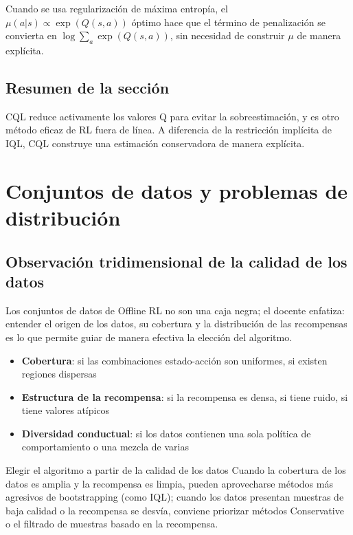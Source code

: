\documentclass[a4paper]{article}
\begin{document}
Cuando se usa regularización de máxima entropía, el $\mu(a|s) \propto \exp(Q(s,a))$ óptimo hace que el término de penalización se convierta en $\log \sum_a \exp(Q(s,a))$, sin necesidad de construir $\mu$ de manera explícita.

\subsection{Resumen de la sección}

CQL reduce activamente los valores Q para evitar la sobreestimación, y es otro método eficaz de RL fuera de línea. A diferencia de la restricción implícita de IQL, CQL construye una estimación conservadora de manera explícita.

\section{Conjuntos de datos y problemas de distribución}

\subsection{Observación tridimensional de la calidad de los datos}

Los conjuntos de datos de Offline RL no son una caja negra; el docente enfatiza: entender el origen de los datos, su cobertura y la distribución de las recompensas es lo que permite guiar de manera efectiva la elección del algoritmo.

\begin{itemize}
    \item \textbf{Cobertura}: si las combinaciones estado-acción son uniformes, si existen regiones dispersas
    \item \textbf{Estructura de la recompensa}: si la recompensa es densa, si tiene ruido, si tiene valores atípicos
    \item \textbf{Diversidad conductual}: si los datos contienen una sola política de comportamiento o una mezcla de varias
\end{itemize}

\begin{importantbox}{Elegir el algoritmo a partir de la calidad de los datos}
Cuando la cobertura de los datos es amplia y la recompensa es limpia, pueden aprovecharse métodos más agresivos de bootstrapping (como IQL); cuando los datos presentan muestras de baja calidad o la recompensa se desvía, conviene priorizar métodos Conservative o el filtrado de muestras basado en la recompensa.
\end{importantbox}
\end{document}
